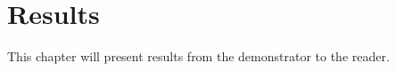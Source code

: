 \chapter{Results}
\label{sec:results}

This chapter will present results from the demonstrator to the reader.
